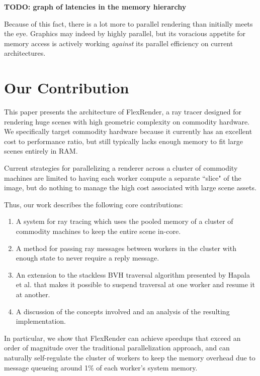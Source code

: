 \documentclass[12pt]{ucthesis}
\begin{document}
\textbf{TODO: graph of latencies in the memory hierarchy}

Because of this fact, there is a lot more to parallel rendering than initially
meets the eye. Graphics may indeed by highly parallel, but its voracious appetite
for memory access is actively working \emph{against} its parallel efficiency on
current architectures.

\section{Our Contribution}
\label{contribution}

This paper presents the architecture of FlexRender, a ray tracer designed for
rendering huge scenes with high geometric complexity on commodity hardware. We
specifically target commodity hardware because it currently has an excellent
cost to performance ratio, but still typically lacks enough memory to fit large
scenes entirely in RAM.

Current strategies for parallelizing a renderer across a cluster of commodity
machines are limited to having each worker compute a separate ``slice" of the
image, but do nothing to manage the high cost associated with large scene
assets.

Thus, our work describes the following core contributions:

\begin{enumerate}
    \item A system for ray tracing which uses the pooled memory of a cluster of
        commodity machines to keep the entire scene in-core.
    \item A method for passing ray messages between workers in the cluster with
        enough state to never require a reply message.
    \item An extension to the stackless BVH traversal algorithm presented by
        Hapala et al. \cite{hapala:2011} that makes it possible to suspend
        traversal at one worker and resume it at another.
    \item A discussion of the concepts involved and an analysis of the resulting
        implementation.
\end{enumerate}

In particular, we show that FlexRender can achieve speedups that exceed an
order of magnitude over the traditional parallelization approach, and can
naturally self-regulate the cluster of workers to keep the memory overhead due
to message queueing around 1\% of each worker's system memory.
\end{document}
